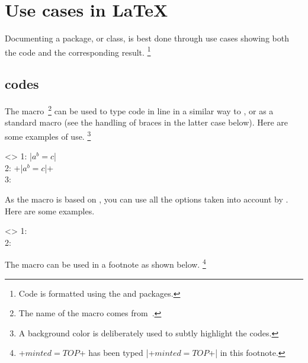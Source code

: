 \documentclass{tutodoc}
\begin{document}
\section{Use cases in \LaTeX}
\label{tutodoc-listing-latex}

Documenting a package, or class, is best done through use cases showing both the code and the corresponding result.%
\footnote{
    Code is formatted using the  and  packages.
}


\subsection{ codes}
\label{tutodoc-listing-latex-inline}

\begin{tdocexa}
    The  macro\,%
    \footnote{
        The name of the macro  comes from \,.
    }
    can be used to type code in line in a similar way to , or as a standard macro (see the handling of braces in the latter case below).
    Here are some examples of use.%
    \footnote{
    	A background color is deliberately used to subtly highlight the \tdoclatexin{\LaTeX} codes.
    }

    \begin{tdoclatex}<>
1: \tdoclatexin|$a^b = c$|               \\
2: \tdoclatexin+\tdoclatexin|$a^b = c$|+ \\
3: 
	\end{tdoclatex}
\end{tdocexa}


\begin{tdocexa}
    As the  macro is based on , you can use all the options taken into account by .
    Here are some examples.

    \begin{tdoclatex}<>
1:  \\
2: 
	\end{tdoclatex}
\end{tdocexa}


\begin{tdocnote}
	The  macro can be used in a footnote as shown below.%
    \footnote{
        \tdoclatexin+$minted = TOP$+ has been typed \tdoclatexin|\tdoclatexin+$minted = TOP$+| in this footnote.
    }
\end{tdocnote}
\end{document}
